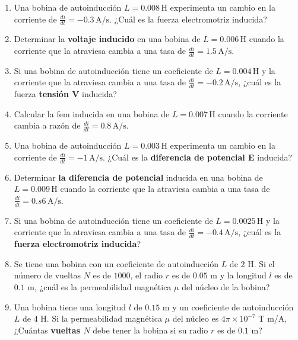\documentclass[../main]{subfiles}
\begin{document}
\begin{enumerate}
    \item Una bobina de autoinducción \( L = 0.008 \, \text{H} \) experimenta un cambio en la corriente de \( \frac{di}{dt} = -0.3 \, \text{A/s} \). ¿Cuál es la fuerza electromotriz inducida?
    
    \item Determinar la \textbf{voltaje inducido} en una bobina de \( L = 0.006 \, \text{H} \) cuando la corriente que la atraviesa cambia a una tasa de \( \frac{di}{dt} = 1.5 \, \text{A/s} \).
    
    \item Si una bobina de autoinducción tiene un coeficiente de \( L = 0.004 \, \text{H} \) y la corriente que la atraviesa cambia a una tasa de \( \frac{di}{dt} = -0.2 \, \text{A/s} \), ¿cuál es la fuerza \textbf{tensión V} inducida?
    
    \item Calcular la fem inducida en una bobina de \( L = 0.007 \, \text{H} \) cuando la corriente cambia a razón de \( \frac{di}{dt} = 0.8 \, \text{A/s} \).
    
    \item Una bobina de autoinducción \( L = 0.003 \, \text{H} \) experimenta un cambio en la corriente de \( \frac{di}{dt} = -1 \, \text{A/s} \). ¿Cuál es la \textbf{diferencia de potencial E} inducida?
    
    \item Determinar \textbf{la diferencia de potencial} inducida en una bobina de \( L = 0.009 \, \text{H} \) cuando la corriente que la atraviesa cambia a una tasa de \( \frac{di}{dt} = 0.s6 \, \text{A/s} \).
    
    \item Si una bobina de autoinducción tiene un coeficiente de \( L = 0.0025 \, \text{H} \) y la corriente que la atraviesa cambia a una tasa de \( \frac{di}{dt} = -0.4 \, \text{A/s} \), ¿cuál es la \textbf{fuerza electromotriz inducida}?

    \item Se tiene una bobina con un coeficiente de autoinducción $L$ de $2$ H. Si el número de vueltas $N$ es de $1000$, el radio $r$ es de $0.05$ m y la longitud $l$ es de $0.1$ m, ¿cuál es la permeabilidad magnética $\mu$ del núcleo de la bobina?
    
    \item Una bobina tiene una longitud $l$ de $0.15$ m y un coeficiente de autoinducción $L$ de $4$ H. Si la permeabilidad magnética $\mu$ del núcleo es $4\pi \times 10^{-7}$ T m/A, ¿Cuántas \textbf{vueltas $N$} debe tener la bobina si su radio $r$ es de $0.1$ m?
    

\end{enumerate}
\end{document}
